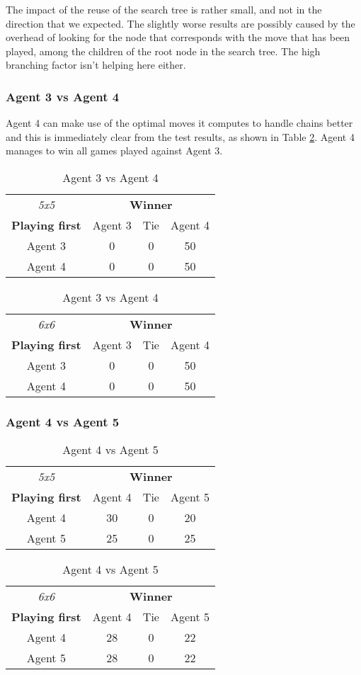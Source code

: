 The impact of the reuse of the search tree is rather small, and not in the direction that we expected. The slightly worse results are possibly caused by the overhead of looking for the node that corresponds with the move that has been played, among the children of the root node in the search tree. The high branching factor isn't helping here either.


\subsubsection{Agent 3 vs Agent 4}
Agent 4 can make use of the optimal moves it computes to handle chains better and this is immediately clear from the test results, as shown in Table \ref{result:Ag3vsAg4}. Agent 4 manages to win all games played against Agent 3.

\begin{table}[!h]
	\centering
	\begin{tabular}{c | c | c | c}
		\textit{5x5} & \multicolumn{3}{c}{\textbf{Winner}}        \\
		\textbf{Playing first} & Agent 3 & Tie & Agent 4 \\ \hline
		Agent 3 & 0 & 0 & 50 \\ \hline
		Agent 4 & 0 & 0 & 50
	\end{tabular}
	\quad
	\begin{tabular}{c | c | c | c}
		\textit{6x6} & \multicolumn{3}{c}{\textbf{Winner}}        \\
		\textbf{Playing first} & Agent 3 & Tie & Agent 4 \\ \hline
		Agent 3 & 0 & 0 & 50 \\ \hline
		Agent 4 & 0 & 0 & 50
	\end{tabular}
	\caption{\label{result:Ag3vsAg4}Agent 3 vs Agent 4}
\end{table}


\subsubsection{Agent 4 vs Agent 5}

\begin{table}[!h]
	\centering
	\label{result:Ag4vsAg5}
	\begin{tabular}{c | c | c | c}
		\textit{5x5} & \multicolumn{3}{c}{\textbf{Winner}}        \\
		\textbf{Playing first} & Agent 4 & Tie & Agent 5 \\ \hline
		Agent 4 & 30 & 0 & 20 \\ \hline
		Agent 5 & 25 & 0 & 25
	\end{tabular}
	\quad
	\begin{tabular}{c | c | c | c}
		\textit{6x6} & \multicolumn{3}{c}{\textbf{Winner}}        \\
		\textbf{Playing first} & Agent 4 & Tie & Agent 5 \\ \hline
		Agent 4 & 28 & 0 & 22 \\ \hline
		Agent 5 & 28 & 0 & 22
	\end{tabular}
	\caption{Agent 4 vs Agent 5}
\end{table}


